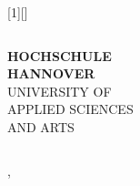 {{\begin{columns}[b]
\begin{column}{0.8\textwidth}
\end{column}
\begin{column}{0.2\textwidth}
\inserttitlegraphic
\end{column}
\end{columns}
}
}{
[1][]
{
\begin{columns}
\begin{column}{0.2\textwidth}
{\tiny
\textbf{HOCHSCHULE\\HANNOVER}\\
UNIVERSITY OF\\APPLIED SCIENCES\\AND ARTS\\
\insertinstitute\par
}
\end{column}
\begin{column}{0.8\textwidth}
\end{column}
\end{columns}
\vfill%
\begin{columns}[b]
\begin{column}{0.75\textwidth}
\inserttitle\par
\vspace*{8pt}
\insertsubtitle\par
\bigskip
{}\insertauthor,~\insertdate\par
\end{column}
\begin{column}{0.25\textwidth}
\inserttitlegraphic
\end{column}
\end{columns}
}
}
\makeatother

